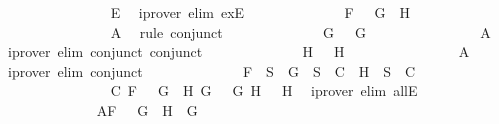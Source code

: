 \begin{isabellebody}
\ \ \ \ \ \ \ \ \ \ \ \ \ \ \isamarkupfalse%
\ E{}\ \isamarkupfalse%
\ {\isacharparenleft}iprover\ elim{\isacharcolon}\ exE{\isacharparenright}\isanewline
\ \ \ \ \ \ \ \ \ \ \ \ \isamarkupfalse%
\ {\isachardoublequoteopen}F\ {\isacharequal}\ \isactrlbold {\isasymnot}\ {\isacharparenleft}G{}\ \isactrlbold {\isasymand}\ H{}{\isacharparenright}{\isachardoublequoteclose}\isanewline
\ \ \ \ \ \ \ \ \ \ \ \ \ \ \isamarkupfalse%
\ A{}\ \isamarkupfalse%
\ {\isacharparenleft}rule\ conjunct{}{\isacharparenright}\isanewline
\ \ \ \ \ \ \ \ \ \ \ \ \isamarkupfalse%
\ {\isachardoublequoteopen}G\ {\isacharequal}\ \isactrlbold {\isasymnot}\ G{}{\isachardoublequoteclose}\isanewline
\ \ \ \ \ \ \ \ \ \ \ \ \ \ \isamarkupfalse%
\ A{}\ \isamarkupfalse%
\ {\isacharparenleft}iprover\ elim{\isacharcolon}\ conjunct{}\ conjunct{}{\isacharparenright}\isanewline
\ \ \ \ \ \ \ \ \ \ \ \ \isamarkupfalse%
\ {\isachardoublequoteopen}H\ {\isacharequal}\ \isactrlbold {\isasymnot}\ H{}{\isachardoublequoteclose}\isanewline
\ \ \ \ \ \ \ \ \ \ \ \ \ \ \isamarkupfalse%
\ A{}\ \isamarkupfalse%
\ {\isacharparenleft}iprover\ elim{\isacharcolon}\ conjunct{}{\isacharparenright}\isanewline
\ \ \ \ \ \ \ \ \ \ \ \ \isamarkupfalse%
\ {\isachardoublequoteopen}F\ {\isasymin}\ S\ {\isasymlongrightarrow}\ {\isacharbraceleft}G{\isacharbraceright}\ {\isasymunion}\ S\ {\isasymin}\ C\ {\isasymor}\ {\isacharbraceleft}H{\isacharbraceright}\ {\isasymunion}\ S\ {\isasymin}\ C{\isachardoublequoteclose}\isanewline
\ \ \ \ \ \ \ \ \ \ \ \ \ \ \isamarkupfalse%
\ C{}\ {\isacartoucheopen}F\ {\isacharequal}\ \isactrlbold {\isasymnot}\ {\isacharparenleft}G{}\ \isactrlbold {\isasymand}\ H{}{\isacharparenright}{\isacartoucheclose}\ {\isacartoucheopen}G\ {\isacharequal}\ \isactrlbold {\isasymnot}\ G{}{\isacartoucheclose}\ {\isacartoucheopen}H\ {\isacharequal}\ \isactrlbold {\isasymnot}\ H{}{\isacartoucheclose}\ \isamarkupfalse%
\ {\isacharparenleft}iprover\ elim{\isacharcolon}\ allE{\isacharparenright}\isanewline
\ \ \ \ \ \ \ \ \ \ \isamarkupfalse%
\isanewline
\ \ \ \ \ \ \ \ \ \ \ \ \isamarkupfalse%
\ A{}{\isacharcolon}{\isachardoublequoteopen}F\ {\isacharequal}\ \isactrlbold {\isasymnot}{\isacharparenleft}\isactrlbold {\isasymnot}\ G{\isacharparenright}\ {\isasymand}\ H\ {\isacharequal}\ G{\isachardoublequoteclose}\isanewline

\end{isabellebody}
